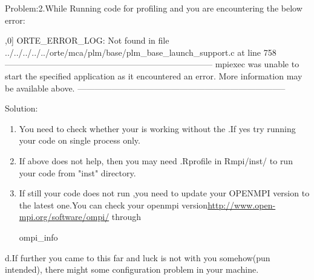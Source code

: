 {\color{red}Problem:2.}While Running  code for profiling and  you are encountering the below error:
\begin{Output}
[G:12221] [[39704,0],0] ORTE_ERROR_LOG: Not found in file ../../../../../orte/mca/plm/base/plm_base_launch_support.c at line 758
--------------------------------------------------------------------------
mpiexec was unable to start the specified application as it encountered an error.
More information may be available above.
--------------------------------------------------------------------------
\end{Output}
{\color{green}Solution:}
\begin{enumerate}
\item You need to check whether your  is working without the .If yes try running your  code on single process only.
\item If above does not help, then you may need .Rprofile in Rmpi/inst/ to run your code from "inst" directory.
\item If still your code does not run ,you need to update your OPENMPI version to the latest one.You can check your openmpi version\url{http://www.open-mpi.org/software/ompi/} through 
\begin{Output}
ompi_info
\end{Output}
\end{enumerate}
d.If further you came to this far and luck is not with you somehow(pun intended), there might some configuration problem in your machine.



